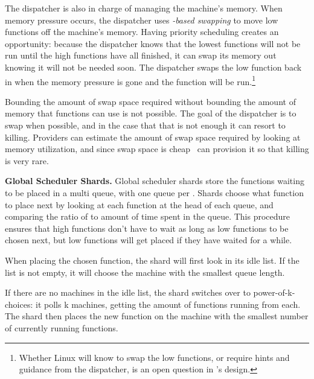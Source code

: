 The dispatcher is also in charge of managing the machine's memory. When memory
pressure occurs, the dispatcher uses \textit{\class{}-based swapping} to move
low \class{} functions off the machine's memory. Having priority scheduling
creates an opportunity: because the dispatcher knows that the lowest \class{}
functions will not be run until the high \class{} functions have all finished,
it can swap its memory out knowing it will not be needed soon. The dispatcher
swaps the low \class{} function back in when the memory pressure is gone and the
function will be run.\footnote{Whether Linux will know to swap the low
\priceclass{} functions, or require hints and guidance from the dispatcher, is
an open question in \sys{}'s design.}

Bounding the amount of swap space required without bounding the amount of memory
that functions can use is not possible. The goal of the dispatcher is to swap
when possible, and in the case that that is not enough it can resort to killing.
Providers can estimate the amount of swap space required by looking at memory
utilization, and since swap space is cheap~\cite{ssd-price} can provision it so
that killing is very rare.

\textbf{Global Scheduler Shards.}
Global scheduler shards store the functions waiting to be placed in a multi
queue, with one queue per \priceclass{}. Shards choose what function to place
next by looking at each function at the head of each queue, and comparing the
ratio of \class{} to amount of time spent in the queue. This procedure ensures
that high \class{} functions don't have to wait as long as low \class{}
functions to be chosen next, but low \class{} functions will get placed if they
have waited for a while.

When placing the chosen function, the shard will first look in its idle list. If
the list is not empty, it will choose the machine with the smallest queue
length.

If there are no machines in the idle list, the shard switches over to
power-of-k-choices: it polls k machines, getting the amount of functions running
from each. The shard then places the new function on the machine with the
smallest number of currently running functions. 
